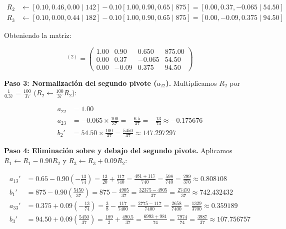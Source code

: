 \begin{align}
R_2 &\leftarrow [0.10, 0.46, 0.00 \mid 142] - 0.10 [1.00, 0.90, 0.65 \mid 875] = [0.00, 0.37, -0.065 \mid 54.50] \\
R_3 &\leftarrow [0.10, 0.00, 0.44 \mid 182] - 0.10 [1.00, 0.90, 0.65 \mid 875] = [0.00, -0.09, 0.375 \mid 94.50]
\end{align}

Obteniendo la matriz:

\begin{equation}
[A|\mathbf{b}]^{(2)} =
\left(\begin{array}{ccc|c}
1.00 & 0.90 & 0.650 & 875.00 \\
0.00 & 0.37 & -0.065 & 54.50 \\
0.00 & -0.09 & 0.375 & 94.50
\end{array}\right)
\end{equation}

\noindent\textbf{Paso 3: Normalización del segundo pivote ($a_{22}$).} Multiplicamos $R_2$ por $\frac{1}{0.37} = \frac{100}{37}$ ($R_2 \leftarrow \frac{100}{37} R_2$):

\begin{align}
a_{22} &= 1.00 \\
a_{23} &= -0.065 \times \frac{100}{37} = -\frac{6.5}{37} = -\frac{13}{74} \approx -0.175676 \\
b_2' &= 54.50 \times \frac{100}{37} = \frac{5450}{37} \approx 147.297297
\end{align}

\noindent\textbf{Paso 4: Eliminación sobre y debajo del segundo pivote.} Aplicamos $R_1 \leftarrow R_1 - 0.90 R_2$ y $R_3 \leftarrow R_3 + 0.09 R_2$:

\begin{align}
a_{13}' &= 0.65 - 0.90\left(-\frac{13}{74}\right) = \frac{13}{20} + \frac{117}{740} = \frac{481 + 117}{740} = \frac{598}{740} = \frac{299}{370} \approx 0.808108 \\
b_1' &= 875 - 0.90\left(\frac{5450}{37}\right) = 875 - \frac{4905}{37} = \frac{32375 - 4905}{37} = \frac{27470}{37} \approx 742.432432 \\
a_{33}' &= 0.375 + 0.09\left(-\frac{13}{74}\right) = \frac{3}{8} - \frac{117}{7400} = \frac{2775 - 117}{7400} = \frac{2658}{7400} = \frac{1329}{3700} \approx 0.359189 \\
b_3' &= 94.50 + 0.09\left(\frac{5450}{37}\right) = \frac{189}{2} + \frac{490.5}{37} = \frac{6993 + 981}{74} = \frac{7974}{74} = \frac{3987}{37} \approx 107.756757
\end{align}

